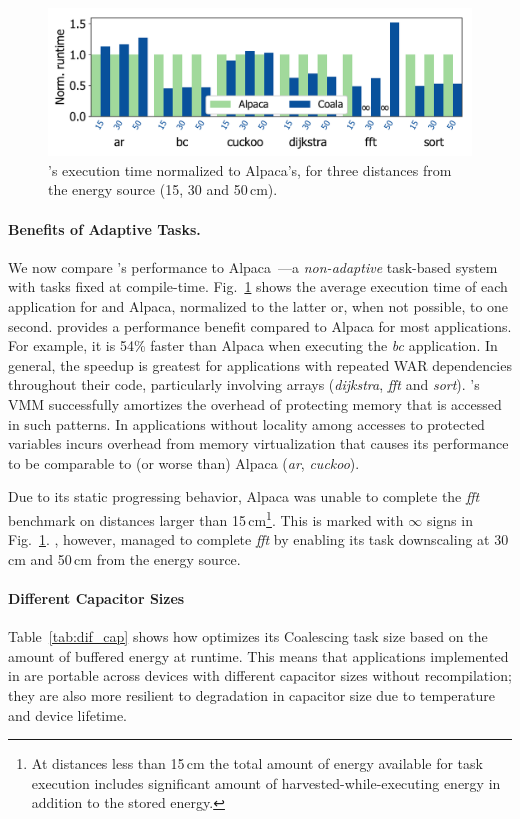 \begin{figure}
    \includegraphics[width=.8\columnwidth]{figures/coala_alpaca_gcc}
    \caption{\sys's execution time normalized to Alpaca's,
    for three distances from the energy source (15, 30 and 50\,cm). }
    \label{fig:runtime}
\end{figure}

\paragraph{Benefits of Adaptive Tasks.}
%
We now compare \sys's performance to Alpaca~\cite{alpaca}---a
\emph{non-adaptive} task-based system with tasks fixed at compile-time.
Fig.~\ref{fig:runtime} shows the average execution time of each
application for \sys and Alpaca, normalized to the latter or, when not possible, to one second.
\sys provides a performance benefit compared to Alpaca for most
applications. For example, it is 54\% faster than Alpaca when executing the \textit{bc} application. In general, the speedup is greatest for applications with repeated WAR
dependencies throughout their code, particularly involving arrays
(\textit{dijkstra}, \textit{fft} and \textit{sort}). \sys's VMM
successfully amortizes the overhead of protecting memory that is accessed in
such patterns.  In applications without locality among accesses to protected
variables \sys incurs overhead from memory
virtualization that causes its performance to be comparable to (or worse than)
Alpaca (\textit{ar}, \textit{cuckoo}).

Due to its static progressing behavior, Alpaca was unable to complete the \textit{fft} benchmark on distances larger than 15\,cm\footnote{At distances less than 15\,cm the total amount of energy available for task execution includes significant amount of harvested-while-executing energy in addition to the stored energy.}. This is marked with $\infty$ signs in Fig.~\ref{fig:runtime}. \sys, however, managed to complete \textit{fft} by enabling its task downscaling at 30\,cm and 50\,cm from the energy source.

\paragraph{Different Capacitor Sizes}
Table~\ref{tab:dif_cap} shows how \sys optimizes its Coalescing task size based on the amount of buffered energy at runtime. This means that applications implemented in \sys are portable across devices with different capacitor sizes without recompilation; they are also more resilient to degradation in capacitor size due to temperature and device lifetime. 


